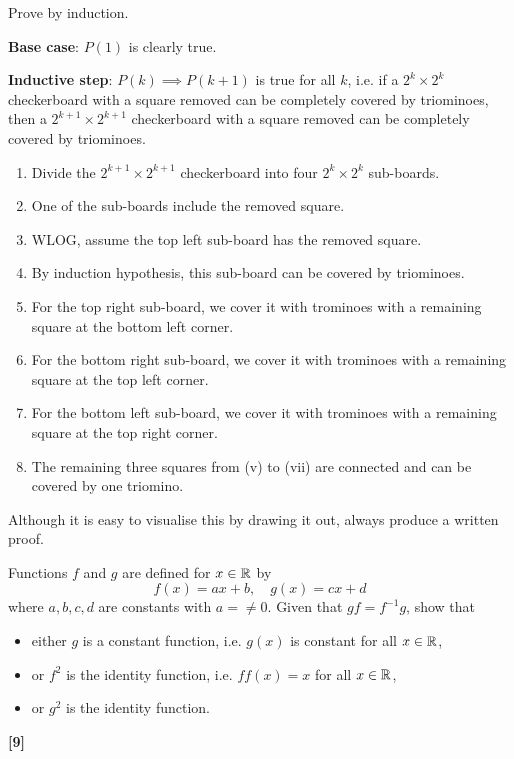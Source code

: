 \begin{solution}
Prove by induction.

\textbf{Base case}: $P(1)$ is clearly true.

\textbf{Inductive step}: $P(k)\implies P(k+1)$ is true for all $k$, i.e. if a $2^k\times2^k$ checkerboard with a square removed can be completely covered by triominoes, then a $2^{k+1}\times2^{k+1}$ checkerboard with a square removed can be completely covered by triominoes.

\begin{enumerate}[label=(\roman*)]
\item Divide the $2^{k+1}\times2^{k+1}$ checkerboard into four $2^k\times2^k$ sub-boards.
\item One of the sub-boards include the removed square.
\item WLOG, assume the top left sub-board has the removed square.
\item By induction hypothesis, this sub-board can be covered by triominoes.
\item For the top right sub-board, we cover it with trominoes with a remaining square at the bottom left corner.
\item For the bottom right sub-board, we cover it with trominoes with a remaining square at the top left corner.
\item For the bottom left sub-board, we cover it with trominoes with a remaining square at the top right corner.
\item The remaining three squares from (v) to (vii) are connected and can be covered by one triomino.
\end{enumerate}
\end{solution}

\begin{remark}
Although it is easy to visualise this by drawing it out, always produce a written proof.
\end{remark}
\pagebreak

\begin{prbm}
Functions $f$ and $g$ are defined for $x\in\mathbb R$ by
\[ f(x)=ax+b, \quad g(x)=cx+d \]
where $a,b,c,d$ are constants with $a=\neq0$. Given that $gf=f^{-1}g$, show that
\begin{itemize}
\item either $g$ is a constant function, i.e. $g(x)$ is constant for all $x\in\mathbb R$,
\item or $f^2$ is the identity function, i.e. $ff(x)=x$ for all $x\in\mathbb R$,
\item or $g^2$ is the identity function.
\end{itemize}
\hfill \textbf{[9]}
\end{prbm}

